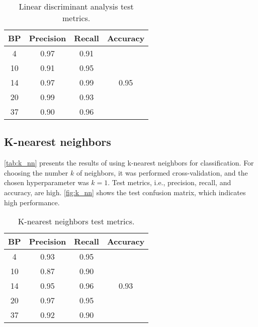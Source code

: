         \begin{table}[H]
                \centering
                \caption{Linear discriminant analysis test metrics.}
                \label{tab:lda}
                \begin{tabular}{c|cc|c}
                BP & Precision & Recall & Accuracy              \\ \hline
                4  & 0.97      & 0.91   & \multirow{5}{*}{0.95} \\
                10 & 0.91      & 0.95   &                       \\
                14 & 0.97      & 0.99   &                       \\
                20 & 0.99      & 0.93   &                       \\
                37 & 0.90      & 0.96   &                      
                \end{tabular}
        \end{table}

    \subsection{K-nearest neighbors}

        \autoref{tab:k_nn} presents the results of using k-nearest neighbors for classification. For choosing the number $k$ of neighbors, it was performed cross-validation, and the chosen hyperparameter was $k = 1$. Test metrics, i.e., precision, recall, and accuracy, are high. \autoref{fig:k_nn} shows the test confusion matrix, which indicates high performance.
        
        \begin{table}[H]
                \centering
                \caption{K-nearest neighbors test metrics.}
                \label{tab:k_nn}
                \begin{tabular}{c|cc|c}
                BP & Precision & Recall & Accuracy              \\ \hline
                4  & 0.93      & 0.95   & \multirow{5}{*}{0.93} \\
                10 & 0.87      & 0.90   &                       \\
                14 & 0.95      & 0.96   &                       \\
                20 & 0.97      & 0.95   &                       \\
                37 & 0.92      & 0.90   &                      
                \end{tabular}
        \end{table}

